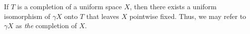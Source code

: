 If $T$ is a completion of a uniform space $X$, then there exists a uniform isomorphism of $\gamma X$ onto $T$ that leaves $X$ pointwise fixed. Thus, we may refer to $\gamma X$ as \textit{the} completion of $X$.
